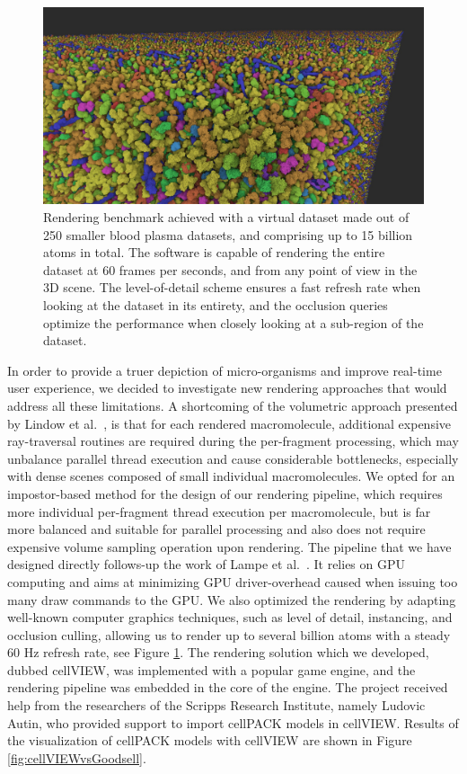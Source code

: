 \begin{figure}
	\centering
	\includegraphics[width=0.82\linewidth]{"graphics/large_scene"}
	\caption{Rendering benchmark achieved with a virtual dataset made out of 250 smaller blood plasma datasets, and comprising up to 15 billion atoms in total. The software is capable of rendering the entire dataset at 60 frames per seconds, and from any point of view in the 3D scene. The level-of-detail scheme ensures a fast refresh rate when looking at the dataset in its entirety, and the occlusion queries optimize the performance when closely looking at a sub-region of the dataset.}
	\label{fig:unity-2015-06-22-01-20-37-65}
\end{figure}

In order to provide a truer depiction of micro-organisms and improve real-time user experience, we decided to investigate new rendering approaches that would address all these limitations.
A shortcoming of the volumetric approach presented by Lindow et al.~\cite{lindow2012interactive}, is that for each rendered macromolecule, additional expensive ray-traversal routines are required during the per-fragment processing, which may unbalance parallel thread execution and cause considerable bottlenecks, especially with dense scenes composed of small individual macromolecules.
We opted for an impostor-based method for the design of our rendering pipeline, which requires more individual per-fragment thread execution per macromolecule, but is far more balanced and suitable for parallel processing and also does not require expensive volume sampling operation upon rendering. 
The pipeline that we have designed directly follows-up the work of Lampe et al.~\cite{lampe2007two}.
It relies on GPU computing and aims at minimizing GPU driver-overhead caused when issuing too many draw commands to the GPU.
We also optimized the rendering by adapting well-known computer graphics techniques, such as level of detail, instancing, and occlusion culling, allowing us to render up to several billion atoms with a steady 60 Hz refresh rate, see Figure \ref{fig:unity-2015-06-22-01-20-37-65}.
The rendering solution which we developed, dubbed cellVIEW, was implemented with a popular game engine, and the rendering pipeline was embedded in the core of the engine.
The project received help from the researchers of the Scripps Research Institute, namely Ludovic Autin, who provided support to import cellPACK models in cellVIEW.
Results of the visualization of cellPACK models with cellVIEW are shown in Figure \ref{fig:cellVIEWvsGoodsell}.

